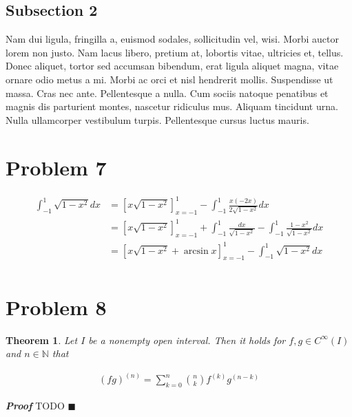 \documentclass[12pt]{article}
\newtheorem{theorem}{Theorem}
\newenvironment{proof}{\textit{\textbf{Proof}}}{\hfill$\blacksquare$}
\begin{document}
\subsection{Subsection 2}
Nam dui ligula, fringilla a, euismod sodales,
sollicitudin vel, wisi. Morbi auctor lorem non justo. Nam lacus
libero, pretium at, lobortis vitae, ultricies et, tellus. Donec
aliquet, tortor sed accumsan bibendum, erat ligula aliquet magna,
vitae ornare odio metus a mi. Morbi ac orci et nisl hendrerit
mollis. Suspendisse ut massa. Cras nec ante. Pellentesque a nulla.
Cum sociis natoque penatibus et magnis dis parturient montes,
nascetur ridiculus mus. Aliquam tincidunt urna. Nulla ullamcorper
vestibulum turpis. Pellentesque cursus luctus mauris.

\section{Problem 7}
\begin{align*}
	\int_{-1}^{1}\sqrt{1-x^2}dx &= \left[x\sqrt{1-x^2} \right]_{x=-1}^{1} - \int_{-1}^{1}\frac{x(-2x)}{2\sqrt{1-x^2}}dx \\
	&= \left[x\sqrt{1-x^2} \right]_{x=-1}^{1} + \int_{-1}^{1}\frac{dx}{\sqrt{1-x^2}} - \int_{-1}^{1}\frac{1-x^2}{\sqrt{1-x^2}}dx \\
	&= \left[x\sqrt{1-x^2} + \arcsin x \right]_{x=-1}^{1} - \int_{-1}^{1}\sqrt{1-x^2}dx \\
\end{align*}

\section*{Problem 8}
\begin{theorem}
	Let $I$ be a nonempty open interval. Then it holds for $f, g \in C^\infty(I)$ and $n \in \mathbb{N}$ that
	
	\begin{align*}
		(fg)^{(n)} = \sum_{k=0}^{n}\binom{n}{k} f^{(k)}g^{(n-k)}
	\end{align*}
\end{theorem}

\begin{proof}
	TODO
\end{proof}

\printindex
\end{document}
